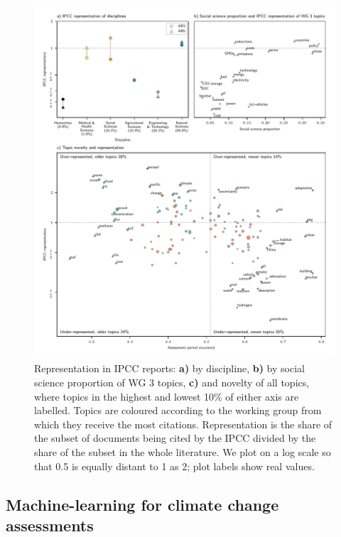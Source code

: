 \documentclass{article}
\begin{document}
\begin{linenumbers}
		\begin{figure}[htp]
			\begin{center}
				\includegraphics[width=180mm]{plots_pub/big_panel_representation.pdf}
				\caption{Representation in IPCC reports: \textbf{a)} by discipline, \textbf{b)} by social science proportion of WG 3 topics, \textbf{c)} and novelty of all topics, where topics in the highest and lowest 10\% of either axis are labelled. Topics are coloured according to the working group from which they receive the most citations. Representation is the share of the subset of documents being cited by the IPCC divided by the share of the subset in the whole literature. We plot on a log scale so that 0.5 is equally distant to 1 as 2; plot labels show real values.}
				\label{oecd_rep}
			\end{center}
		\end{figure}
		
		
		\subsection*{Machine-learning for climate change assessments}
		

\end{linenumbers}
\end{document}
